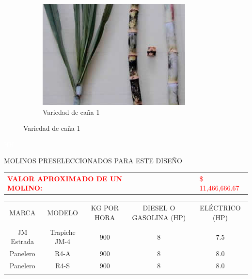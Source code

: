 \documentclass{article}%
\begin{document}
\begin{figure}[h!]%
\begin{subfigure}{0.33\linewidth}%
\includegraphics[width=0.95\linewidth]{Cana/RD75-11.png}%
\caption{Variedad de caña 1}%
\end{subfigure}%
\linebreak%
\newpage%
\end{figure}

%
\newpage%
\textcolor{white}{ 
HH
}%
\newpage%
\begin{center}%
\begin{Huge}%
MOLINOS PRESELECCIONADOS PARA ESTE DISEÑO%
\end{Huge}%
\linebreak%
\end{center}%
\begin{tabular}{lcccccl}%
\textcolor{red}{ 
\textbf{VALOR APROXIMADO DE UN MOLINO: }
}& & & & & &\textcolor{red}{ 
\$ 11,466,666.67
}\\%
\end{tabular}%
\linebreak%
\begin{tabular}{ccccc}%
MARCA&MODELO&KG POR HORA&DIESEL O GASOLINA (HP)&ELÉCTRICO (HP)\\%
&&&&\\%
JM Estrada&Trapiche JM{-}4&900&8&7.5\\%
Panelero&R4{-}A&900&8&8.0\\%
Panelero&R4{-}S&900&8&8.0\\%
\linebreak%
\newline%
%
\linebreak%
\end{tabular}%
\end{document}
